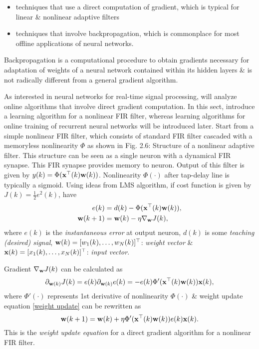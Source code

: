 \documentclass{article}
\begin{document}
\begin{enumerate}
\begin{itemize}
\begin{itemize}
			\begin{itemize}
				\item techniques that use a direct computation of gradient, which is typical for linear \& nonlinear adaptive filters
				\item techniques that involve backpropagation, which is commonplace for most offline applications of neural networks.
			\end{itemize}
			Backpropagation is a computational procedure to obtain gradients necessary for adaptation of weights of a neural network contained within its hidden layers \& is not radically different from a general gradient algorithm.
			
			As interested in neural networks for real-time signal processing, will analyze online algorithms that involve direct gradient computation. In this sect, introduce a learning algorithm for a nonlinear FIR filter, whereas learning algorithms for online training of recurrent neural networks will be introduced later. Start from a simple nonlinear FIR filter, which consists of standard FIR filter cascaded with a memoryless nonlinearity $\Phi$ as shown in Fig. 2.6: {\sf Structure of a nonlinear adaptive filter.} This structure can be seen as a single neuron with a dynamical FIR synapse. This FIR synapse provides memory to neuron. Output of this filter is given by $y(k) = \Phi({\bf x}^\top(k){\bf w}(k))$. Nonlinearity $\Phi(\cdot)$ after tap-delay line is typically a sigmoid. Using ideas from LMS algorithm, if cost function is given by $J(k) = \frac{1}{2}e^2(k)$, have
			\begin{align}
				e(k) &= d(k) - \Phi({\bf x}^\top(k){\bf w}(k)),\\
				{\bf w}(k + 1) &= {\bf w}(k) - \eta\nabla_{\bf w}J(k),\label{weight update}
			\end{align}
			where $e(k)$ is the {\it instantaneous error} at output neuron, $d(k)$ is some {\it teaching (desired) signal}, ${\bf w}(k) = [w_1(k),\ldots,w_N(k)]^\top$: {\it weight vector} \& ${\bf x}(k) = [x_1(k),\ldots,x_N(k)]^\top$: {\it input vector}.
			
			Gradient $\nabla_{\bf w}J(k)$ can be calculated as
			\begin{equation}
				\partial_{{\bf w}(k)}J(k) = e(k)\partial_{{\bf w}(k)}e(k) = -e(k)\Phi'({\bf x}^\top(k){\bf w}(k)){\bf x}(k),
			\end{equation}
			where $\Phi'(\cdot)$ represents 1st derivative of nonlinearity $\Phi(\cdot)$ \& weight update equation \eqref{weight update} can be rewritten as
			\begin{equation}
				{\bf w}(k + 1) = {\bf w}(k) + \eta\Phi'({\bf x}^\top(k){\bf w}(k))e(k){\bf x}(k).
			\end{equation}
			This is the {\it weight update equation} for a direct gradient algorithm for a nonlinear FIR filter.
			

\end{itemize}
\end{itemize}
\end{enumerate}
\end{document}
